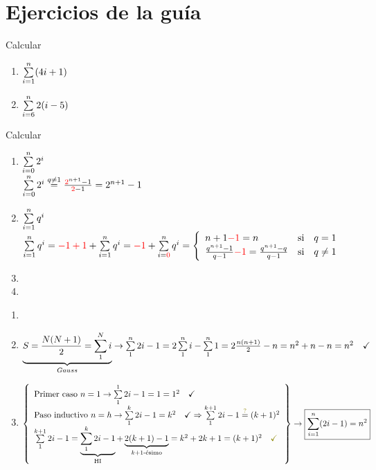 \section*{Ejercicios de la guía}
\ejercicio
\hacer


\ejercicio

\hacer


\ejercicio
Calcular
\begin{multicols}{2}
	\begin{enumerate}[label=\roman*)]
		\item $ \sumatoria{i=1}{n} (4i + 1) $
		      \hacer


		\item $\sumatoria{i=6}{n} 2(i-5)$
		      \hacer

	\end{enumerate}
\end{multicols}

\ejercicio Calcular \begin{enumerate}[label=\roman*)] \item $\sumatoria{i=0}{n}2^i$\\
	      $ \sumatoria{i=0}{n}2^i \stackrel{q\neq1} = \frac{\red{2}^{n+1} - 1}{\red{2} - 1} = 2^{n+1} - 1 $

	\item $\sumatoria{i=1}{n} q^i$\\
	      $\sumatoria{i=1}{n} q^i = \red{-1 + 1} + \sumatoria{i=1}{n} q^i = \red{-1} + \sumatoria{i = \red{0}}{n} q^i =
		      \llave{lll}{
			      n + 1 \red{-1} = n & \text{si} & q = 1\\
			      \frac{q^{n+1}-1}{q-1} \red{-1} = \frac{q^{n+1} - q}{q-1} & \text{si} & q \distinto 1\\
		      }$

	\item \hacer
	\item \hacer
\end{enumerate}

\ejercicio
\begin{enumerate}[label=\roman*)]
	\item
	      \hacer

	\item $\underbrace{S = \frac{N(N+1)}{2} = \sumatoria{1}{N} i }_{Gauss} \to \sumatoria{1}{n} 2i -1 = 2 \sumatoria{1}{n}i - \sumatoria{1}{n} 1 = 2 \frac{n (n+1)}{2} - n = n^2 + n -n = n^2 \Tilde $

	\item $
		      \llaves{ l }{
			      \text{Primer caso } n = 1 \to \sumatoria{1}{1} 2i -1 = 1 = 1^2 \Tilde\\
			      \text{Paso inductivo } n = h \to \sumatoria{1}{k} 2i -1 = k^2 \Tilde \entonces \sumatoria{1}{k+1} 2i -1 \stackrel{\green{?}}= (k+1)^2\\
			      \sumatoria{1}{k+1} 2i -1 =
			      \HI{
				      \sumatoria{1}{k} 2i -1
			      } + \kmasuno{
				      2(k+1) -1
			      } = k^2 + 2k + 1 = (k+1)^2 \green{\Tilde}
		      } \to \boxed{\sumatoria{i = 1}{n} (2i - 1) = n^2}$
\end{enumerate}

